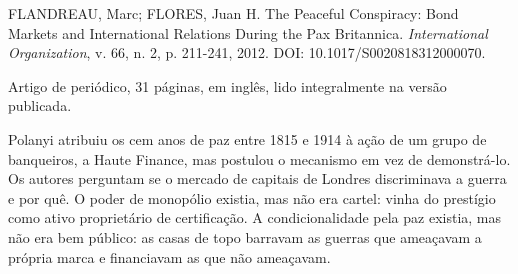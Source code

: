 
\begin{identificacao}
FLANDREAU, Marc; FLORES, Juan H. The Peaceful Conspiracy: Bond Markets and
International Relations During the Pax Britannica. \textit{International
Organization}, v. 66, n. 2, p. 211-241, 2012. DOI: 10.1017/S0020818312000070.

Artigo de periódico, 31 páginas, em inglês, lido integralmente na versão
publicada.
\end{identificacao}


Polanyi atribuiu os cem anos de paz entre 1815 e 1914 à ação de um grupo de
banqueiros, a Haute Finance, mas postulou o mecanismo em vez de demonstrá-lo.
Os autores perguntam se o mercado de capitais de Londres discriminava a guerra
e por quê. O poder de monopólio existia, mas não era cartel: vinha do
prestígio como ativo proprietário de certificação. A condicionalidade pela paz
existia, mas não era bem público: as casas de topo barravam as guerras que
ameaçavam a própria marca e financiavam as que não ameaçavam.


